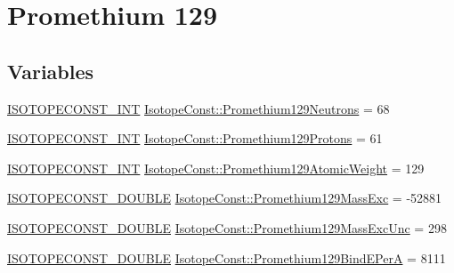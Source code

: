 \hypertarget{group___isotope_const-_promethium-_pm129}{}\section{Promethium 129}
\label{group___isotope_const-_promethium-_pm129}
\subsection*{Variables}
\begin{DoxyCompactItemize}
\item 
\mbox{\hyperlink{group___isotope_const-_macros_ga5f18360b3e99483a35c32d789e62621c}{I\+S\+O\+T\+O\+P\+E\+C\+O\+N\+S\+T\+\_\+\+I\+NT}} \mbox{\hyperlink{group___isotope_const-_promethium-_pm129_gaf9038bb2ab124e2f2e5a961e03eb82f2}{Isotope\+Const\+::\+Promethium129\+Neutrons}} = 68
\item 
\mbox{\hyperlink{group___isotope_const-_macros_ga5f18360b3e99483a35c32d789e62621c}{I\+S\+O\+T\+O\+P\+E\+C\+O\+N\+S\+T\+\_\+\+I\+NT}} \mbox{\hyperlink{group___isotope_const-_promethium-_pm129_ga4ada889facbfb86b763d2572adfb1ded}{Isotope\+Const\+::\+Promethium129\+Protons}} = 61
\item 
\mbox{\hyperlink{group___isotope_const-_macros_ga5f18360b3e99483a35c32d789e62621c}{I\+S\+O\+T\+O\+P\+E\+C\+O\+N\+S\+T\+\_\+\+I\+NT}} \mbox{\hyperlink{group___isotope_const-_promethium-_pm129_ga7c5deafad2425d2f3ef417974d19545e}{Isotope\+Const\+::\+Promethium129\+Atomic\+Weight}} = 129
\item 
\mbox{\hyperlink{group___isotope_const-_macros_ga8f45a7272ce02c0b4c65c44636ed719a}{I\+S\+O\+T\+O\+P\+E\+C\+O\+N\+S\+T\+\_\+\+D\+O\+U\+B\+LE}} \mbox{\hyperlink{group___isotope_const-_promethium-_pm129_ga5f2018029dcad65f998a7761cab1d577}{Isotope\+Const\+::\+Promethium129\+Mass\+Exc}} = -\/52881
\item 
\mbox{\hyperlink{group___isotope_const-_macros_ga8f45a7272ce02c0b4c65c44636ed719a}{I\+S\+O\+T\+O\+P\+E\+C\+O\+N\+S\+T\+\_\+\+D\+O\+U\+B\+LE}} \mbox{\hyperlink{group___isotope_const-_promethium-_pm129_gafdf040002b44e2531a6f3cc11641ac07}{Isotope\+Const\+::\+Promethium129\+Mass\+Exc\+Unc}} = 298
\item 
\mbox{\hyperlink{group___isotope_const-_macros_ga8f45a7272ce02c0b4c65c44636ed719a}{I\+S\+O\+T\+O\+P\+E\+C\+O\+N\+S\+T\+\_\+\+D\+O\+U\+B\+LE}} \mbox{\hyperlink{group___isotope_const-_promethium-_pm129_ga9fa7185920b573657bbef3524f8a8bf5}{Isotope\+Const\+::\+Promethium129\+Bind\+E\+PerA}} = 8111
\item 

\end{DoxyCompactItemize}
